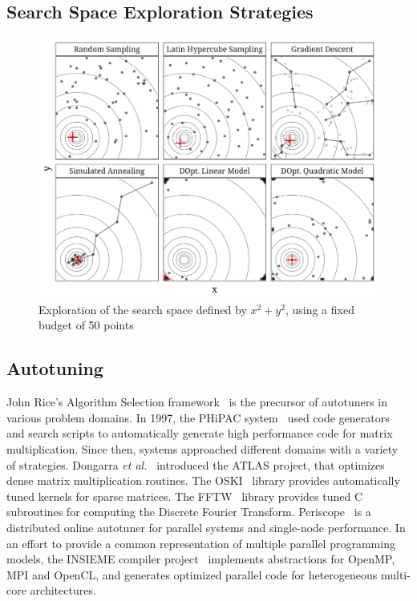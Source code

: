 \documentclass[conference]{IEEEtran}
\begin{document}
\subsection{Search Space Exploration Strategies}
\label{sec:org6747773}
\begin{center}
\begin{figure}[htbp]
\centering
\includegraphics[width=.95\columnwidth]{./img/sampling_comparison.pdf}
\caption{Exploration of the search space defined by \(x^2 + y^2\), using a fixed budget of 50 points}
\end{figure}
\end{center}
\subsection{Autotuning}
\label{sec:org961a385}
John Rice's Algorithm Selection framework~\cite{rice1976algorithm} is the
precursor of autotuners in various problem domains. In 1997, the PHiPAC
system~\cite{bilmes1997optimizing} used code generators and search scripts
to automatically generate high performance code for matrix multiplication. Since
then, systems approached different domains with a variety of strategies.
Dongarra \emph{et al.}~\cite{dongarra1998automatically} introduced the ATLAS
project, that optimizes dense matrix multiplication routines. The
OSKI~\cite{vuduc2005oski} library provides automatically tuned kernels for
sparse matrices. The FFTW~\cite{frigo1998fftw} library provides tuned C
subroutines for computing the Discrete Fourier Transform.
Periscope~\cite{gerndt2010automatic} is a distributed online autotuner for
parallel systems and single-node performance. In an effort to provide a common
representation of multiple parallel programming models, the INSIEME compiler
project~\cite{jordan2012multi} implements abstractions for OpenMP, MPI and
OpenCL, and generates optimized parallel code for heterogeneous multi-core
architectures.
\end{document}
